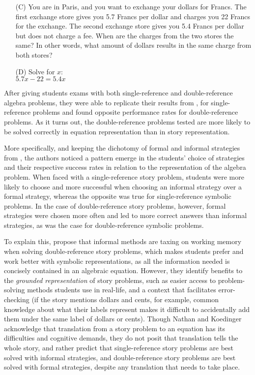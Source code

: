 \documentclass[10pt,letterpaper]{article}
\begin{document}
	\begin{enumerate}
		\item[(C)] You are in Paris, and you want to
		exchange your dollars for Francs. The first exchange store gives you 5.7
		Francs per dollar and charges you 22 Francs for the
		exchange. The second exchange store gives
		you 5.4 Francs per dollar but does not charge a
		fee. When are the charges from the two
		stores the same? In other words, what
		amount of dollars results in the same charge
		from both stores?
		
		\item[(D)] Solve for $x$:\\ $5.7x - 22 = 5.4x$
	\end{enumerate}
	
	After giving students exams with both single-reference and double-reference algebra problems, they were able to replicate their results from \cite{KoedNath2004}, for single-reference problems and found opposite performance rates for double-reference problems. As it turns out, the double-reference problems  tested are more likely to be solved correctly in equation representation than in story representation. 
	
	More specifically, and keeping the dichotomy of formal and informal strategies from , the authors noticed a pattern emerge in the students' choice of strategies and their respective success rates in relation to the representation of the algebra problem. When faced with a single-reference story problem, students were more likely to choose and more successful when choosing an informal strategy over a formal strategy, whereas the opposite was true for single-reference symbolic problems. In the case of double-reference story problems, however, formal strategies were chosen more often and led to more correct answers than informal strategies, as was the case for double-reference symbolic problems. 
	
	To explain this,  propose that informal methods are taxing on working memory when solving double-reference story problems, which makes students prefer and work better with symbolic representations, as all the information needed is concisely contained in an algebraic equation. However, they identify benefits to the \textit{grounded representation} of story problems, such as easier access to problem-solving methods students use in real-life, and a context that facilitates error-checking (if the story mentions dollars and cents, for example, common knowledge about what their labels represent makes it difficult to accidentally add them under the same label of dollars or cents). Though Nathan and Koedinger acknowledge that translation from a story problem to an equation has its difficulties and cognitive demands, they do not posit that translation tells the whole story, and rather predict that single-reference story problems are best solved with informal strategies, and double-reference story problems are best solved with formal strategies, despite any translation that needs to take place.
	
\end{document}
